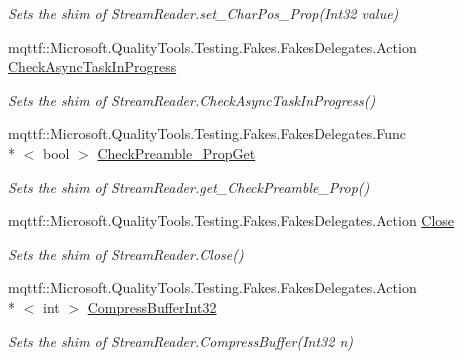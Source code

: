 \begin{DoxyCompactItemize}
\begin{DoxyCompactList}\small\item\em Sets the shim of Stream\-Reader.\-set\-\_\-\-Char\-Pos\-\_\-\-Prop(\-Int32 value)\end{DoxyCompactList}\item 
mqttf\-::\-Microsoft.\-Quality\-Tools.\-Testing.\-Fakes.\-Fakes\-Delegates.\-Action \hyperlink{class_system_1_1_i_o_1_1_fakes_1_1_shim_stream_reader_a405dab20a78e869949b7e140117bfce0}{Check\-Async\-Task\-In\-Progress}
\begin{DoxyCompactList}\small\item\em Sets the shim of Stream\-Reader.\-Check\-Async\-Task\-In\-Progress()\end{DoxyCompactList}\item 
mqttf\-::\-Microsoft.\-Quality\-Tools.\-Testing.\-Fakes.\-Fakes\-Delegates.\-Func\\*
$<$ bool $>$ \hyperlink{class_system_1_1_i_o_1_1_fakes_1_1_shim_stream_reader_a7805e159392bd0dba4a7a1909475825d}{Check\-Preamble\-\_\-\-Prop\-Get}
\begin{DoxyCompactList}\small\item\em Sets the shim of Stream\-Reader.\-get\-\_\-\-Check\-Preamble\-\_\-\-Prop()\end{DoxyCompactList}\item 
mqttf\-::\-Microsoft.\-Quality\-Tools.\-Testing.\-Fakes.\-Fakes\-Delegates.\-Action \hyperlink{class_system_1_1_i_o_1_1_fakes_1_1_shim_stream_reader_a3456303d294816bae37b0bd0b3798e5e}{Close}
\begin{DoxyCompactList}\small\item\em Sets the shim of Stream\-Reader.\-Close()\end{DoxyCompactList}\item 
mqttf\-::\-Microsoft.\-Quality\-Tools.\-Testing.\-Fakes.\-Fakes\-Delegates.\-Action\\*
$<$ int $>$ \hyperlink{class_system_1_1_i_o_1_1_fakes_1_1_shim_stream_reader_a5440fd7fe5681738e7dca2d3ba504773}{Compress\-Buffer\-Int32}
\begin{DoxyCompactList}\small\item\em Sets the shim of Stream\-Reader.\-Compress\-Buffer(\-Int32 n)\end{DoxyCompactList}\item 

\end{DoxyCompactItemize}
